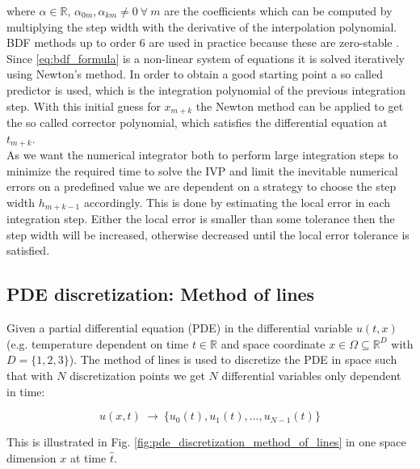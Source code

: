 \documentclass{scrartcl}[12pt, halfparskip]
\numberwithin{equation}{section}
\numberwithin{figure}{section}
\numberwithin{table}{section}
\begin{document}
where $\alpha \in \mathbb{R}$, $\alpha_{0m},\alpha_{km} \ne 0 \ \forall \ m$ are the coefficients which can be computed by multiplying the step width with the derivative of the interpolation polynomial.  \\
BDF methods up to order 6 are used in practice because these are zero-stable \cite{numerik1_skript_koerkel}. \\
Since \eqref{eq:bdf_formula} is a non-linear system of equations it is solved iteratively using Newton's method. In order to obtain a good starting point a so called predictor is used, which is the integration polynomial of the previous integration step. With this initial guess for $x_{m+k}$ the Newton method can be applied to get the so called corrector polynomial, which satisfies the differential equation at $t_{m+k}$. \\
As we want the numerical integrator both to perform large integration steps to minimize the required time to solve the IVP and limit the inevitable numerical errors on a predefined value we are dependent on a strategy to choose the step width $h_{m+k-1}$ accordingly. This is done by estimating the local error in each integration step. Either the local error is smaller than some tolerance then the step width will be increased, otherwise decreased until the local error tolerance is satisfied. \\







\subsection{PDE discretization: Method of lines}
\label{subsection:pde_discretization}



Given a partial differential equation (PDE) in the differential variable $u(t,x)$ (e.g. temperature dependent on time $t \in \mathbb{R}$ and space coordinate $x \in \Omega \subseteq \mathbb{R}^D$ with $D=\{1,2,3\}$). The method of lines is used to discretize the PDE in space such that with $N$ discretization points we get $N$ differential variables only dependent in time:

\begin{equation}
	u(x,t) \ \rightarrow \ \{ u_0(t), u_1(t), ..., u_{N-1}(t) \}
\end{equation}

This is illustrated in Fig. \ref{fig:pde_discretization_method_of_lines} in one space dimension $x$ at time $\hat{t}$.
\end{document}
